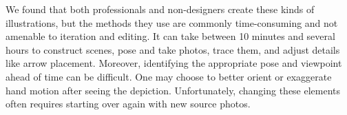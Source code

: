 We found that both professionals and non-designers create these kinds of illustrations, but the methods they use are commonly time-consuming and not amenable to iteration and editing.
It can take between 10 minutes and several hours to construct scenes, pose and take photos, trace them, and adjust details like arrow placement. Moreover, identifying the appropriate pose and viewpoint ahead of time can be difficult. One may choose to better orient or exaggerate hand motion after seeing the depiction. Unfortunately, changing these elements often requires starting over again with new source photos.

%



